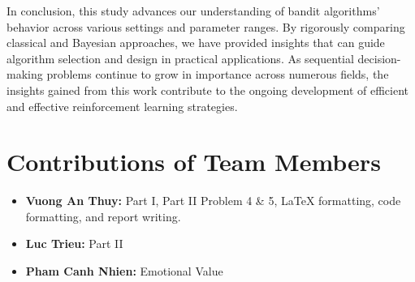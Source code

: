 \documentclass[11pt]{article}
\begin{document}
In conclusion, this study advances our understanding of bandit algorithms' behavior across various settings and parameter ranges. By rigorously comparing classical and Bayesian approaches, we have provided insights that can guide algorithm selection and design in practical applications. As sequential decision-making problems continue to grow in importance across numerous fields, the insights gained from this work contribute to the ongoing development of efficient and effective reinforcement learning strategies.

\newpage
\section{Contributions of Team Members}
\begin{itemize}
    \item \textbf{Vuong An Thuy:} Part I, Part II Problem 4 \& 5, LaTeX formatting, code formatting, and report writing.
    \item \textbf{Luc Trieu:} Part II
    \item \textbf{Pham Canh Nhien:} Emotional Value
\end{itemize}
\end{document}

